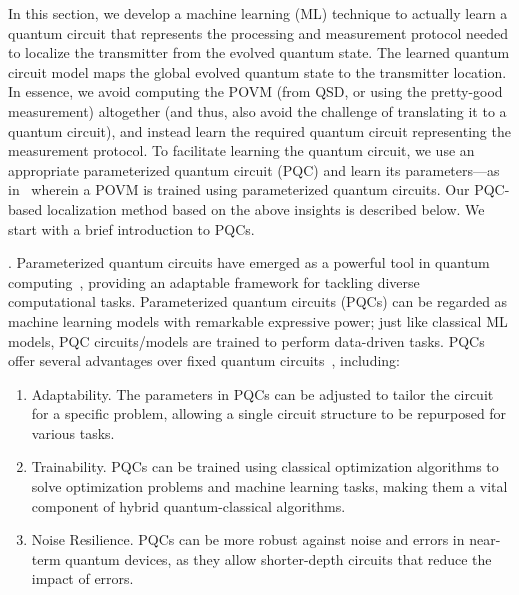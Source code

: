 In this section, we develop a machine learning (ML) technique to actually learn a quantum circuit that represents the processing and measurement protocol needed to localize the transmitter from the evolved quantum state.
The learned quantum circuit model maps the global evolved quantum state to the transmitter location.
In essence, we avoid computing the POVM (from QSD, or using the pretty-good measurement) altogether (and thus, also avoid the challenge of translating it to a quantum circuit), and instead learn the required quantum circuit representing the measurement protocol.
To facilitate learning the quantum circuit, we use an appropriate parameterized quantum circuit (PQC) and learn 
its parameters---as in~\cite{PhysRevResearch.qsd-qnn} 
wherein a POVM is trained using parameterized quantum circuits.
Our PQC-based localization method based on the above insights is described
below. We start with a brief introduction to PQCs.

.
Parameterized quantum circuits have emerged as a powerful tool in quantum computing~\cite{Benedetti_2019}, providing an adaptable framework for tackling diverse computational tasks. 
Parameterized quantum circuits (PQCs) can be regarded as machine learning models with remarkable expressive power; just like classical ML models, PQC circuits/models are trained to perform data-driven tasks. 
PQCs offer several advantages over fixed quantum circuits~\cite{Benedetti_2019, quantumnas2022,quantumnat2022}, including:
\begin{enumerate}
    \item Adaptability. The parameters in PQCs can be adjusted to tailor the circuit for a specific problem, allowing a single circuit structure to be repurposed for various tasks.
    \item Trainability. PQCs can be trained using classical optimization algorithms to solve optimization problems and machine learning tasks, making them a vital component of hybrid quantum-classical algorithms. 
    \item Noise Resilience. PQCs can be more robust against noise and errors in near-term quantum devices, as they allow shorter-depth circuits that reduce the impact of errors. 
\end{enumerate}


